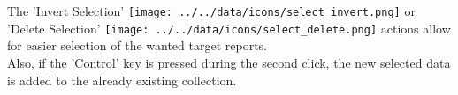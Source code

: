 The 'Invert Selection' \texttt{[image: ../../data/icons/select\_invert.png]} or 'Delete Selection' \texttt{[image: ../../data/icons/select\_delete.png]} actions allow for easier selection of the wanted target reports. \\

Also, if the 'Control' key is pressed during the second click, the new selected data is added to the already existing collection.









